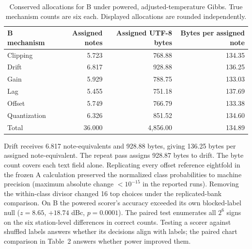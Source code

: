 \documentclass[11pt,a4paper]{article}
\begin{document}
\begin{table}[ht]
\centering
\begin{tabular}{@{}lrrr@{}}
\toprule
B mechanism & Assigned notes & Assigned UTF-8 bytes & Bytes per assigned note\\ \midrule
Clipping & 5.723 & 768.88 & 134.35\\
Drift & 6.817 & 928.88 & 136.25\\
Gain & 5.929 & 788.75 & 133.03\\
Lag & 5.455 & 751.18 & 137.69\\
Offset & 5.749 & 766.79 & 133.38\\
Quantization & 6.326 & 851.52 & 134.60\\
\midrule Total &36.000&4,856.00&134.89\\ \bottomrule
\end{tabular}
\caption{Conserved allocations for B under powered, adjusted-temperature Gibbs. True mechanism counts are six each. Displayed allocations are rounded independently.}
\end{table}
Drift receives 6.817 note-equivalents and 928.88 bytes, giving 136.25 bytes per assigned note-equivalent. The repeat pass assigns 928.87 bytes to drift. The byte count covers each text field alone. Replicating every offset reference eightfold in the frozen A calculation preserved the normalized class probabilities to machine precision (maximum absolute change $<10^{-15}$ in the reported runs). Removing the within-class divisor changed 16 top choices under the replicated-bank comparison. On B the powered scorer's accuracy exceeded its own blocked-label null ($z=8.65$, $+18.74$ dBc, $p=0.0001$). The paired test enumerates all $2^6$ signs on the six station-level differences in correct counts. Testing a scorer against shuffled labels answers whether its decisions align with labels; the paired chart comparison in Table~2 answers whether power improved them.
\end{document}
